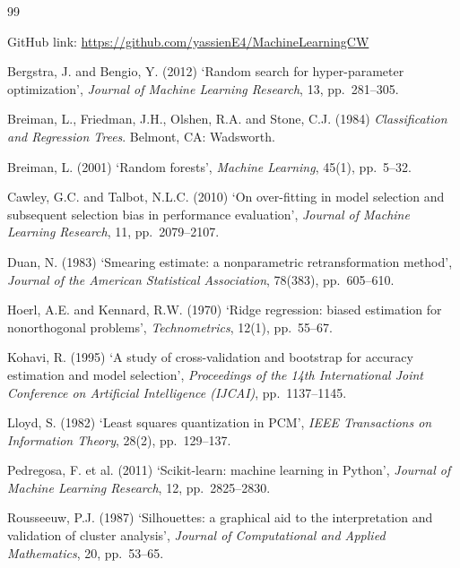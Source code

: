 \clearpage
\begin{thebibliography}{99}
{}
GitHub link: \url{https://github.com/yassienE4/MachineLearningCW}

Bergstra, J. and Bengio, Y. (2012) `Random search for hyper-parameter optimization', \emph{Journal of Machine Learning Research}, 13, pp.~281--305.

Breiman, L., Friedman, J.H., Olshen, R.A. and Stone, C.J. (1984) \emph{Classification and Regression Trees}. Belmont, CA: Wadsworth.

Breiman, L. (2001) `Random forests', \emph{Machine Learning}, 45(1), pp.~5--32.

Cawley, G.C. and Talbot, N.L.C. (2010) `On over-fitting in model selection and subsequent selection bias in performance evaluation', \emph{Journal of Machine Learning Research}, 11, pp.~2079--2107.

Duan, N. (1983) `Smearing estimate: a nonparametric retransformation method', \emph{Journal of the American Statistical Association}, 78(383), pp.~605--610.

Hoerl, A.E. and Kennard, R.W. (1970) `Ridge regression: biased estimation for nonorthogonal problems', \emph{Technometrics}, 12(1), pp.~55--67.

Kohavi, R. (1995) `A study of cross-validation and bootstrap for accuracy estimation and model selection', \emph{Proceedings of the 14th International Joint Conference on Artificial Intelligence (IJCAI)}, pp.~1137--1145.

Lloyd, S. (1982) `Least squares quantization in PCM', \emph{IEEE Transactions on Information Theory}, 28(2), pp.~129--137.

Pedregosa, F. et al. (2011) `Scikit-learn: machine learning in Python', \emph{Journal of Machine Learning Research}, 12, pp.~2825--2830.

Rousseeuw, P.J. (1987) `Silhouettes: a graphical aid to the interpretation and validation of cluster analysis', \emph{Journal of Computational and Applied Mathematics}, 20, pp.~53--65.
\end{thebibliography}
